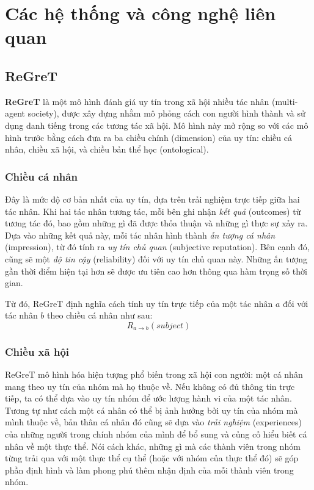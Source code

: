 \chapter{Các hệ thống và công nghệ liên quan}

\section{ReGreT}

\textbf{ReGreT} \cite{regret-reputation-system} là một mô hình đánh giá uy tín trong xã hội nhiều tác nhân (multi-agent society), được xây dựng nhằm mô phỏng cách con người hình thành và sử dụng danh tiếng trong các tương tác xã hội.
Mô hình này mở rộng so với các mô hình trước bằng cách đưa ra ba chiều chính (dimension) của uy tín: chiều cá nhân, chiều xã hội, và chiều bản thể học (ontological).

\subsection{Chiều cá nhân}

Đây là mức độ cơ bản nhất của uy tín, dựa trên trải nghiệm trực tiếp giữa hai tác nhân. Khi hai tác nhân tương tác, mỗi bên ghi nhận \textit{kết quả} (outcomes) từ tương tác đó, bao gồm những gì đã được thỏa thuận và những gì thực sự xảy ra.
Dựa vào những kết quả này, mỗi tác nhân hình thành \textit{ấn tượng cá nhân} (impression), từ đó tính ra \textit{uy tín chủ quan} (subjective reputation). Bên cạnh đó, cũng sẽ một
\textit{độ tin cậy} (reliability) đối với uy tín chủ quan này. Những ấn tượng gần thời điểm hiện tại hơn sẽ được ưu tiên cao hơn thông qua hàm trọng số thời gian.

Từ đó, ReGreT định nghĩa cách tính uy tín trực tiếp của một tác nhân $a$ đối với tác nhân $b$ theo chiều cá nhân như sau:
\[R_{a \rightarrow b}(subject)\]

\subsection{Chiều xã hội}

ReGreT mô hình hóa hiện tượng phổ biến trong xã hội con người: một cá nhân mang theo uy tín của nhóm mà họ thuộc về. Nếu không có đủ thông tin trực tiếp, ta có thể dựa vào uy tín nhóm để ước lượng hành vi của một tác nhân.
Tương tự như cách một cá nhân có thể bị ảnh hưởng bởi uy tín của nhóm mà mình thuộc về, bản thân cá nhân đó cũng sẽ dựa vào \textit{trải nghiệm} (experiences) của những người trong chính nhóm của mình để bổ sung và củng cố hiểu biết cá nhân về một thực thể.
Nói cách khác, những gì mà các thành viên trong nhóm từng trải qua với một thực thể cụ thể (hoặc với nhóm của thực thể đó) sẽ góp phần định hình và làm phong phú thêm nhận định của mỗi thành viên trong nhóm.

